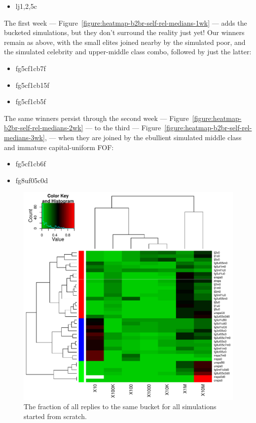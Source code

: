 \documentclass[10pt,oneside]{memoir}
\begin{document}
\begin{Spacing}{2}
\begin{itemize}
\item lj{1,2,5}c
\end{itemize}

The first week --- Figure~\ref{figure:heatmap-b2br-self-rel-medians-1wk} ---  adds the bucketed simulations, but they don't surround the reality just yet!  Our winners remain as above, with the small elites joined nearby by the simulated poor, and the simulated celebrity and upper-middle class combo, followed by just the latter:


\begin{itemize}


\item fg5cf1cb7f

\item fg5cf1cb15f

\item fg5cf1cb5f
\end{itemize}

The same winners persist through the second week --- Figure~\ref{figure:heatmap-b2br-self-rel-medians-2wk} ---  to the third --- Figure~\ref{figure:heatmap-b2br-self-rel-medians-3wk}, ---  when they are joined by the ebullient simulated middle class and immature capital-uniform FOF:


\begin{itemize}


\item fg5cf1cb6f

\item fg8uf05c0d
\end{itemize}


\begin{figure}
\begin{center}
    \includegraphics{figures/crop/heatmap-b2br-self-rel-medians-0wk}
    \caption{The fraction of all replies to the same bucket for all simulations started from scratch.}
    \label{figure:heatmap-b2br-self-rel-medians-0wk}
\end{center}
\end{figure}


\end{Spacing}
\end{document}
